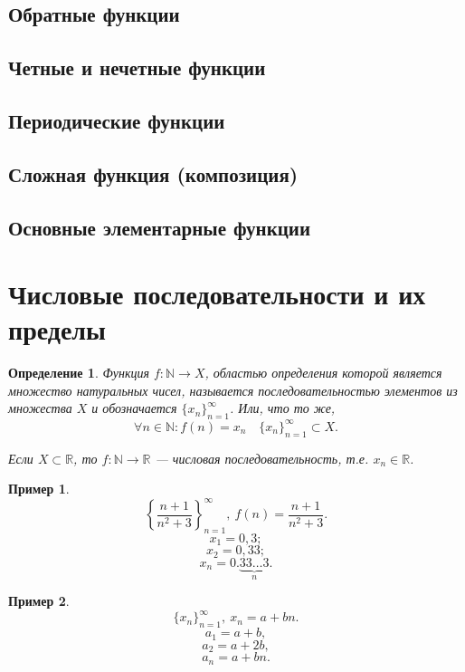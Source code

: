 \documentclass[a4paper,12pt]{article} %
\newtheorem{definition}{Определение}[section]
\theoremstyle{remark}
\theoremstyle{definition}
\newtheorem{exmp}{Пример}[section]
\begin{document}
\subsection{Обратные функции}
\subsection{Четные и нечетные функции}
\subsection{Периодические функции}
\subsection{Сложная функция (композиция)}
\subsection{Основные элементарные функции}



\newpage
\section{Числовые последовательности и их пределы}

\begin{definition}
    Функция $f : \mathbb{N} \to X$, областью определения которой является множество натуральных чисел,
    называется последовательностью элементов из множества $X$ и обозначается $\{x_n\}_{n=1}^{\infty}$. Или, что то же,
    \[\forall n\in \mathbb{N}:f(n) = x_{n} \quad \{x_n\}_{n=1}^{\infty} \subset X.\] 

	Если $X \subset \mathbb{R}$, то $f:\mathbb{N}\rightarrow \mathbb{R}$ --- числовая последовательность, 
    т.е. $x_n \in \mathbb{R}$.
\end{definition}
\begin{exmp}
    \[\left\{\frac{n+1}{n^2+3}\right\}_{n=1}^{\infty}, \ f(n) = \frac{n+1}{n^2+3}.\]
    \[x_1 = 0,3;\] 
    \[x_2 = 0,33;\]
    \[x_n = 0.\underbrace{33\ldots 3}_n.\]
\end{exmp}
\begin{exmp}
    \[\{x_n\}_{n=1}^{\infty}, \ x_{n} = a + bn.\] 
    \[a_1 = a + b,\]
    \[a_2 = a + 2b,\]
    \[a_n = a + bn.\] 
\end{exmp}
\end{document}
